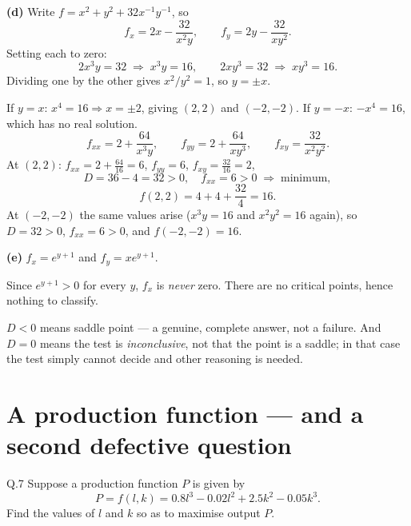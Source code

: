 \begin{solution}
\medskip
\textbf{(d)} Write $f=x^{2}+y^{2}+32x^{-1}y^{-1}$, so
\[
f_x=2x-\frac{32}{x^{2}y},\qquad f_y=2y-\frac{32}{xy^{2}} .
\]
Setting each to zero:
\[
2x^{3}y=32 \;\Rightarrow\; x^{3}y=16,
\qquad
2xy^{3}=32 \;\Rightarrow\; xy^{3}=16 .
\]
Dividing one by the other gives $x^{2}/y^{2}=1$, so $y=\pm x$.

If $y=x$: $x^{4}=16 \Rightarrow x=\pm2$, giving $(2,2)$ and $(-2,-2)$.
If $y=-x$: $-x^{4}=16$, which has no real solution.
\[
f_{xx}=2+\frac{64}{x^{3}y},\qquad f_{yy}=2+\frac{64}{xy^{3}},\qquad
f_{xy}=\frac{32}{x^{2}y^{2}} .
\]
At $(2,2)$: $f_{xx}=2+\tfrac{64}{16}=6$, $f_{yy}=6$, $f_{xy}=\tfrac{32}{16}=2$,
\[
D=36-4=32>0,\quad f_{xx}=6>0 \;\Longrightarrow\; \text{minimum},
\]
\[
f(2,2)=4+4+\frac{32}{4}=16 .
\]
At $(-2,-2)$ the same values arise ($x^{3}y=16$ and $x^{2}y^{2}=16$ again), so
$D=32>0$, $f_{xx}=6>0$, and $f(-2,-2)=16$.

\medskip
\textbf{(e)} $f_x=e^{y+1}$ and $f_y=xe^{y+1}$.

Since $e^{y+1}>0$ for every $y$, $f_x$ is \emph{never} zero. There are no
critical points, hence nothing to classify.
\end{solution}

\begin{pitfall}
$D<0$ means saddle point --- a genuine, complete answer, not a failure. And
$D=0$ means the test is \emph{inconclusive}, not that the point is a saddle;
in that case the test simply cannot decide and other reasoning is needed.
\end{pitfall}

\section{A production function --- and a second defective question}
\label{sec:u8q7}

\begin{question}{Q.7}
Suppose a production function $P$ is given by
\[
P=f(l,k)=0.8l^{3}-0.02l^{2}+2.5k^{2}-0.05k^{3}.
\]
Find the values of $l$ and $k$ so as to maximise output $P$.
\end{question}

